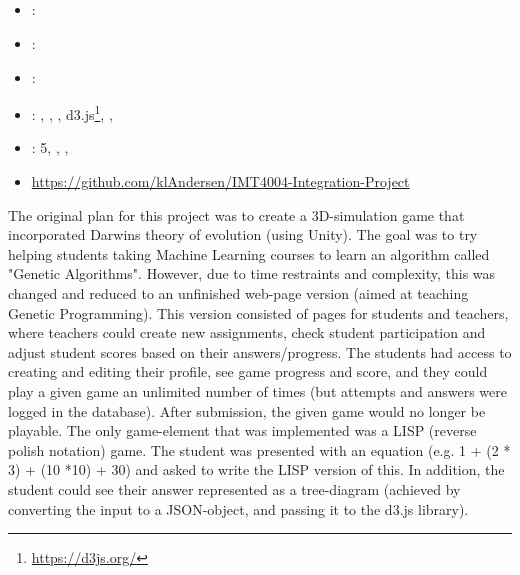 \subsection[Integration project]{}
\label{sec:key}
\begin{itemize} 
	\item {}: 
	\item {}: 
	\item {}: 
	\item {}: , , , d3.js\footnote{\url{https://d3js.org/}}, , 
	\item {}: 5, , , 
	\item {} \url{https://github.com/klAndersen/IMT4004-Integration-Project}
\end{itemize} 
The original plan for this project was to create a 3D-simulation game that incorporated Darwins theory of evolution (using Unity). 
The goal was to try helping students taking Machine Learning courses to learn an algorithm called "Genetic Algorithms". 
However, due to time restraints and complexity, this was changed and reduced to an unfinished web-page version (aimed at teaching Genetic Programming).
\vspace{0.5em}\newline
This version consisted of pages for students and teachers, where teachers could create new assignments, 
check student participation and adjust student scores based on their answers/progress. 
The students had access to creating and editing their profile, see game progress and score, and they could play a given game an unlimited number of times 
(but attempts and answers were logged in the database). 
After submission, the given game would no longer be playable.
\vspace{0.5em}\newline
The only game-element that was implemented was a LISP (reverse polish notation) game. 
The student was presented with an equation (e.g. 1 + (2 * 3) + (10 *10) + 30) and asked to write the LISP version of this. 
In addition, the student could see their answer represented as a tree-diagram (achieved by converting the input to a JSON-object, and passing it to the d3.js library).
